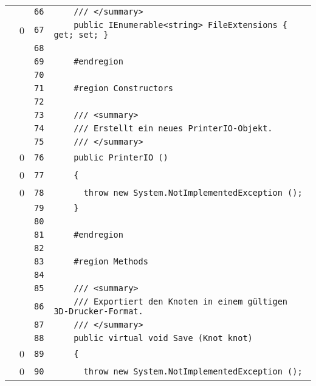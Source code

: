 \documentclass[a4paper,10pt]{article}
\begin{document}
\begin{longtable}[l]{lrrl}
\cellcolor{gray} &  & \verb~66~ & \verb~    /// </summary>~\\
\cellcolor{red} & 0 & \verb~67~ & \verb~    public IEnumerable<string> FileExtensions { get; set; }~\\
\cellcolor{gray} &  & \verb~68~ & \verb~~\\
\cellcolor{gray} &  & \verb~69~ & \verb~    #endregion~\\
\cellcolor{gray} &  & \verb~70~ & \verb~~\\
\cellcolor{gray} &  & \verb~71~ & \verb~    #region Constructors~\\
\cellcolor{gray} &  & \verb~72~ & \verb~~\\
\cellcolor{gray} &  & \verb~73~ & \verb~    /// <summary>~\\
\cellcolor{gray} &  & \verb~74~ & \verb~    /// Erstellt ein neues PrinterIO-Objekt.~\\
\cellcolor{gray} &  & \verb~75~ & \verb~    /// </summary>~\\
\cellcolor{red} & 0 & \verb~76~ & \verb~    public PrinterIO ()~\\
\cellcolor{red} & 0 & \verb~77~ & \verb~    {~\\
\cellcolor{red} & 0 & \verb~78~ & \verb~      throw new System.NotImplementedException ();~\\
\cellcolor{gray} &  & \verb~79~ & \verb~    }~\\
\cellcolor{gray} &  & \verb~80~ & \verb~~\\
\cellcolor{gray} &  & \verb~81~ & \verb~    #endregion~\\
\cellcolor{gray} &  & \verb~82~ & \verb~~\\
\cellcolor{gray} &  & \verb~83~ & \verb~    #region Methods~\\
\cellcolor{gray} &  & \verb~84~ & \verb~~\\
\cellcolor{gray} &  & \verb~85~ & \verb~    /// <summary>~\\
\cellcolor{gray} &  & \verb~86~ & \verb~    /// Exportiert den Knoten in einem gültigen 3D-Drucker-Format.~\\
\cellcolor{gray} &  & \verb~87~ & \verb~    /// </summary>~\\
\cellcolor{gray} &  & \verb~88~ & \verb~    public virtual void Save (Knot knot)~\\
\cellcolor{red} & 0 & \verb~89~ & \verb~    {~\\
\cellcolor{red} & 0 & \verb~90~ & \verb~      throw new System.NotImplementedException ();~\\

\end{longtable}
\end{document}
